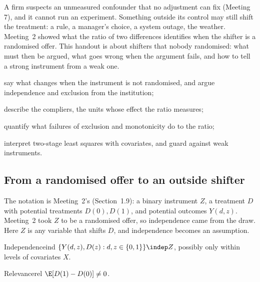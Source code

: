 \documentclass[11pt]{article}
\begin{document}

\begin{decision}
A firm suspects an unmeasured confounder that no adjustment can fix (Meeting 7), and it cannot run an experiment. Something
outside its control may still shift the treatment: a rule, a manager's choice, a system outage, the weather. Meeting~2 showed
what the ratio of two differences identifies when the shifter is a randomised offer. This handout is about shifters that
nobody randomised: what must then be argued, what goes wrong when the argument fails, and how to tell a strong instrument
from a weak one.
\end{decision}

\begin{goals}
  \item say what changes when the instrument is not randomised, and argue independence and exclusion from the institution;
  \item describe the compliers, the units whose effect the ratio measures;
  \item quantify what failures of exclusion and monotonicity do to the ratio;
  \item interpret two-stage least squares with covariates, and guard against weak instruments.
\end{goals}

\sectionone

\subsection{From a randomised offer to an outside shifter}

The notation is Meeting~2's (Section~1.9): a binary instrument $Z$, a treatment $D$ with potential treatments $D(0), D(1)$,
and potential outcomes $Y(d, z)$. Meeting~2 took $Z$ to be a randomised offer, so independence came from the draw. Here
$Z$ is any variable that shifts $D$, and independence becomes an assumption.

\begin{assum}{Independence}{ind}
$\{Y(d,z), D(z) : d, z \in \{0,1\}\} \indep Z$, possibly only within levels of covariates $X$.
\end{assum}
\begin{assum}{Relevance}{rel}
$\E[D(1) - D(0)] \ne 0$.
\end{assum}
\end{document}
